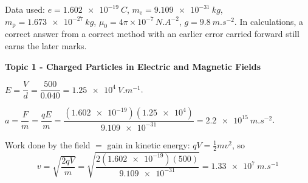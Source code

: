 \documentclass[12pt]{article}
\newcommand\anstopic[1]{\par\Needspace{8\baselineskip}\vspace{4mm}%
  \begin{center}{\headfont\bfseries\fontsize{14}{18}\selectfont #1\par}\end{center}\vspace{2pt}}
\begin{document}

Data used: $e = \qty{1.602e-19}{C}$, $m_\mathrm{e} = \qty{9.109e-31}{kg}$, $m_\mathrm{p} = \qty{1.673e-27}{kg}$,
$\mu_0 = 4\pi\times10^{-7}\,\si{N.A^{-2}}$, $g = \qty{9.8}{m.s^{-2}}$. In calculations, a correct answer
from a correct method with an earlier error carried forward still earns the later marks.

\anstopic{Topic 1 - Charged Particles in Electric and Magnetic Fields}

\ansq
{}
\begin{crit}
\end{crit}
\sample
$E = \dfrac{V}{d} = \dfrac{500}{0.040} = \qty{1.25e4}{V.m^{-1}}$.
\begin{crit}
\end{crit}
\sample
$a = \dfrac{F}{m} = \dfrac{qE}{m} = \dfrac{(\num{1.602e-19})(\num{1.25e4})}{\num{9.109e-31}} = \qty{2.2e15}{m.s^{-2}}$.
\begin{crit}
\end{crit}
\sample
Work done by the field $=$ gain in kinetic energy: $qV = \frac{1}{2}mv^2$, so
\[ v = \sqrt{\frac{2qV}{m}} = \sqrt{\frac{2(\num{1.602e-19})(500)}{\num{9.109e-31}}} = \qty{1.33e7}{m.s^{-1}} \]
\end{document}
